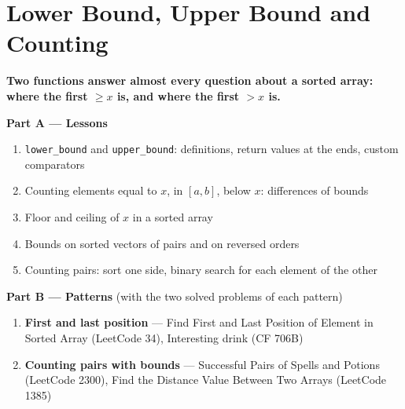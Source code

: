 \chapter{Lower Bound, Upper Bound and Counting}
\label{ch:bounds}

\begin{tcolorbox}[enhanced, colback=white, colframe=secondaryblue, boxrule=1pt, arc=2mm]
\textbf{\large\textcolor{primaryblue}{Two functions answer almost every question about a sorted array: where the first $\ge x$ is, and where the first $> x$ is.}}
\end{tcolorbox}


\begin{plannedbox}
\textbf{Part A --- Lessons}
\begin{enumerate}[leftmargin=*, label=\textbf{A\arabic*.}, itemsep=1pt]
    \item \texttt{lower\_bound} and \texttt{upper\_bound}: definitions, return values at the ends, custom comparators
    \item Counting elements equal to $x$, in $[a, b]$, below $x$: differences of bounds
    \item Floor and ceiling of $x$ in a sorted array
    \item Bounds on sorted vectors of pairs and on reversed orders
    \item Counting pairs: sort one side, binary search for each element of the other
\end{enumerate}
\textbf{Part B --- Patterns} (with the two solved problems of each pattern)
\begin{enumerate}[leftmargin=*, label=\textbf{P\arabic*.}, itemsep=1pt]
    \item \textbf{First and last position} --- Find First and Last Position of Element in Sorted Array {\small\color{darkgray}(LeetCode 34)}, Interesting drink {\small\color{darkgray}(CF 706B)}
    \item \textbf{Counting pairs with bounds} --- Successful Pairs of Spells and Potions {\small\color{darkgray}(LeetCode 2300)}, Find the Distance Value Between Two Arrays {\small\color{darkgray}(LeetCode 1385)}
\end{enumerate}
\end{plannedbox}
